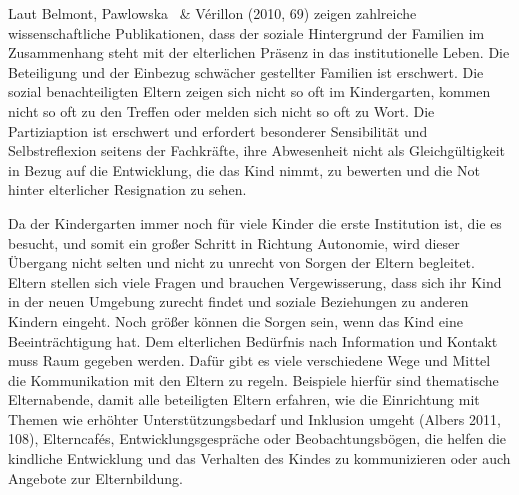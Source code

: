 Laut Belmont, Pawlowska ~\& Vérillon (2010, 69) zeigen zahlreiche wissenschaftliche Publikationen, dass der soziale Hintergrund der Familien im Zusammenhang steht mit der elterlichen Präsenz in das institutionelle Leben. Die Beteiligung und der Einbezug schwächer gestellter Familien ist erschwert. Die sozial benachteiligten Eltern zeigen sich nicht so oft im Kindergarten, kommen nicht so oft zu den Treffen oder melden sich nicht so oft zu Wort. Die Partiziaption ist erschwert und erfordert besonderer Sensibilität und Selbstreflexion seitens der Fachkräfte, ihre Abwesenheit nicht als Gleichgültigkeit in Bezug auf die Entwicklung, die das Kind nimmt, zu bewerten und die Not hinter elterlicher Resignation zu sehen.

Da der Kindergarten immer noch für viele Kinder die erste Institution ist, die es besucht, und somit ein großer Schritt in Richtung Autonomie, wird dieser Übergang nicht selten und nicht zu unrecht von Sorgen der Eltern begleitet. Eltern stellen sich viele Fragen und brauchen Vergewisserung, dass sich ihr Kind in der neuen Umgebung zurecht findet und soziale Beziehungen zu anderen Kindern eingeht. Noch größer können die Sorgen sein, wenn das Kind eine Beeinträchtigung hat. Dem elterlichen Bedürfnis nach Information und Kontakt muss Raum gegeben werden. Dafür gibt es viele verschiedene Wege und Mittel die Kommunikation mit den Eltern zu regeln. Beispiele hierfür sind thematische Elternabende, damit alle beteiligten Eltern erfahren, wie die Einrichtung mit Themen wie erhöhter Unterstützungsbedarf und Inklusion umgeht (Albers 2011, 108), Elterncafés, Entwicklungsgespräche oder Beobachtungsbögen, die helfen die kindliche Entwicklung und das Verhalten des Kindes zu kommunizieren oder auch Angebote zur Elternbildung.  
  


